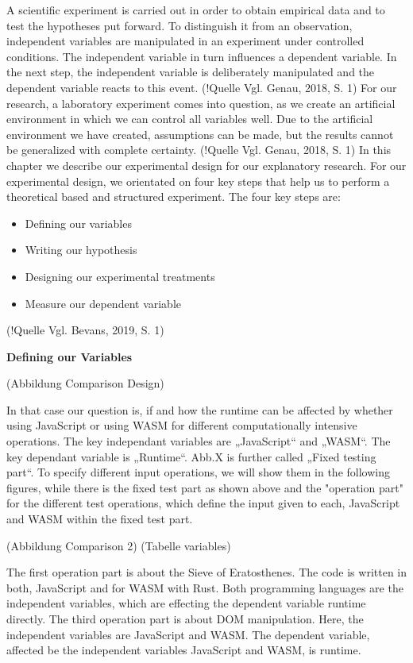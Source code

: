 A scientific experiment is carried out in order to obtain empirical data and to test the hypotheses put forward. To distinguish it from an observation, independent variables are manipulated in an experiment under controlled conditions. The independent variable in turn influences a dependent variable. In the next step, the independent variable is deliberately manipulated and the dependent variable reacts to this event. (!Quelle Vgl. Genau, 2018, S. 1)
For our research, a laboratory experiment comes into question, as we create an artificial environment in which we can control all variables well. Due to the artificial environment we have created, assumptions can be made, but the results cannot be generalized with complete certainty. (!Quelle Vgl. Genau, 2018, S. 1)
In this chapter we describe our experimental design for our explanatory research. 
For our experimental design, we orientated on four key steps that help us to perform a theoretical based and structured experiment. The four key steps are:\newline
\begin{itemize}
    \item Defining our variables
    \item Writing our hypothesis
    \item Designing our experimental treatments
    \item Measure our dependent variable
\end{itemize}
(!Quelle Vgl. Bevans, 2019, S. 1)

\textbf{Defining our Variables} \newline

(Abbildung Comparison Design)

In that case our question is, if and how the runtime can be affected by whether using JavaScript or using WASM for different computationally intensive operations. The key independant variables are „JavaScript“ and „WASM“. The key dependant variable is „Runtime“. Abb.X is further called „Fixed testing part“.
To specify different input operations, we will show them in the following figures, while there is the fixed test part as shown above and the "operation part" for the different test operations, which define the input given to each, JavaScript and WASM within the fixed test part.

(Abbildung Comparison 2)
(Tabelle variables)

The first operation part is about the Sieve of Eratosthenes. The code is written in both, JavaScript and for WASM with Rust. Both programming languages are the independent variables, which are effecting the dependent variable runtime directly.
The third operation part is about DOM manipulation. Here, the independent variables are JavaScript and WASM. The dependent variable, affected be the independent variables JavaScript and WASM, is runtime.

